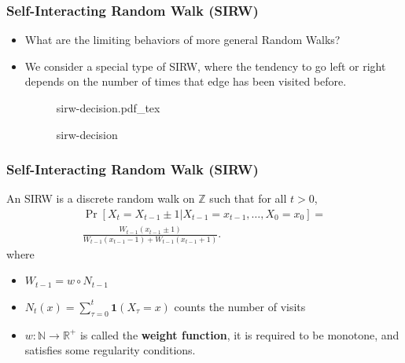\documentclass{beamer}
\newcommand{\incfig}[1]{%


    \def\svgwidth{\columnwidth}
    {#1.pdf_tex}
}
\begin{document}
\begin{frame}
	\frametitle{Self-Interacting Random Walk (SIRW)}

	\begin{itemize}
		\item What are the limiting behaviors of more general Random Walks?
	
		\item<2->
	We consider a special type of SIRW, where the tendency to go left or right depends on the number of times that edge has been visited before.

\begin{figure}[ht]
    \centering
    \incfig{sirw-decision}
    \caption{sirw-decision}
    \label{fig:sirw-decision}
\end{figure}
	\end{itemize}
\end{frame}

\begin{frame}
	\frametitle{Self-Interacting Random Walk (SIRW)}
	\begin{definition}
		An SIRW is a discrete random walk on $\mathbb{Z}$ such that for all $t > 0$,
		\begin{multline*}
			\operatorname{Pr} \left[ X_{t} = X_{t - 1} \pm 1 | X_{t-1} =  x_{t-1}, \ldots, X_0 = x_0 \right] =\\
			\frac{W_{t-1}(x_{t-1} \pm 1)}{W_{t-1}(x_{t-1}-1)+W_{t-1}(x_{t-1}+1)}
		.\end{multline*} 
		where 
		\begin{itemize}
			\item $W_{t-1} = w \circ N_{t-1}$
			\item $N_{t}(x) = \sum_{\tau=0}^{t} \mathbf{1}(X_\tau = x)$ counts the number of visits
			\item $w: \mathbb{N} \to \mathbb{R}^+$ is called the \textbf{weight function}, it is required to be monotone, and satisfies some regularity conditions.
		\end{itemize}
	\end{definition}
	
\end{frame}
\end{document}
